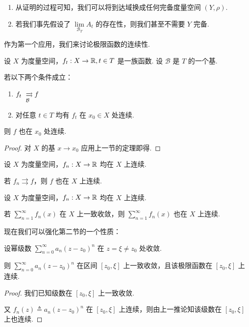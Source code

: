 \begin{hint}
    \begin{enumerate}
        \item 从证明的过程可知，我们可以将到达域换成任何完备度量空间 $(Y,\rho)$.
        
        \item 若我们事先假设了 $\lim\limits_{\mathcal{B}_T}A_t$ 的存在性，则我们甚至不需要 $Y$ 完备.
    \end{enumerate}
\end{hint}


作为第一个应用，我们来讨论极限函数的连续性.

\begin{theorem}
    设 $X$ 为度量空间，$f_t:X\to\mathbb{R},t\in T$ 是一族函数. 设 $\mathcal{B}$ 是 $T$ 的一个基.

    若以下两个条件成立：

    \begin{enumerate}
        \item $f_t\xrightrightarrows[\mathcal{B}]{}{f}$
        
        \item 对任意 $t\in T$ 均有 $f_t$ 在 $x_0\in X$ 处连续.
    \end{enumerate}

    则 $f$ 也在 $x_0$ 处连续.
\end{theorem}
\begin{proof}
    对 $X$ 的基 $x\to x_0$ 应用上一节的定理即得.
\end{proof}

\begin{inference}
    设 $X$ 为度量空间，$f_n:X\to\mathbb{R}$ 均在 $X$ 上连续.

    若 $f_n\rightrightarrows f$，则 $f$ 也在 $X$ 上连续.
\end{inference}

\begin{inference}
    设 $X$ 为度量空间，$f_n:X\to\mathbb{R}$ 均在 $X$ 上连续.

    若 $\sum\limits_{n=1}^\infty f_n(x)$ 在 $X$ 上一致收敛，则 $\sum\limits_{n=1}^\infty f_n(x)$ 也在 $X$ 上连续.
\end{inference}

现在我们可以强化第二节的一个性质：

\begin{property}[Abel]
    设幂级数 $\sum\limits_{n=0}^\infty a_n(z-z_0)^n$ 在 $z=\xi\ne z_0$ 处收敛.
    
    则 $\sum\limits_{n=0}^\infty a_n(z-z_0)^n$ 在区间 $[z_0,\xi]$ 上一致收敛，且该极限函数在 $[z_0,\xi]$ 上连续.
\end{property}
\begin{proof}
    我们已知级数在 $[z_0,\xi]$ 上一致收敛.

    又 $f_n(z)\triangleq a_n(z-z_0)^n$ 在 $[z_0,\xi]$ 上连续，则由上一推论知该级数在 $[z_0,\xi]$ 上也连续.
\end{proof}

